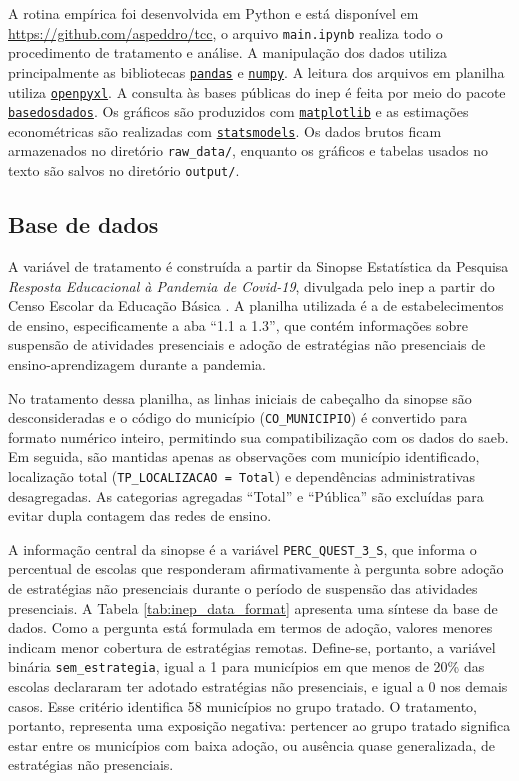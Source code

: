 \documentclass[
	12pt,				%
	openright,			%
	oneside,			%
	a4paper,			%
	brazil,				%
	]{article}
\begin{document}
A rotina empírica foi desenvolvida em Python e está disponível em \url{https://github.com/aspeddro/tcc},
o arquivo \texttt{main.ipynb} realiza todo o procedimento de tratamento e análise.
A manipulação dos dados utiliza principalmente as bibliotecas \texttt{\href{https://pypi.org/project/pandas/}{pandas}}
e \texttt{\href{https://pypi.org/project/numpy}{numpy}}. A leitura dos arquivos em 
planilha utiliza \texttt{\href{https://pypi.org/project/openpyxl/}{openpyxl}}. A consulta 
às bases públicas do \acrshort{inep} é feita por meio do pacote \texttt{\href{https://pypi.org/project/basedosdados/}{basedosdados}}. 
Os gráficos são produzidos com \texttt{\href{https://pypi.org/project/matplotlib}{matplotlib}} e as
estimações econométricas são realizadas com \texttt{\href{https://pypi.org/project/statsmodels}{statsmodels}}.
Os dados brutos ficam armazenados no diretório \texttt{raw\_data/}, enquanto os gráficos
e tabelas usados no texto são salvos no diretório \texttt{output/}.

\subsection{Base de dados}

A variável de tratamento é construída a partir da Sinopse Estatística da
Pesquisa \textit{Resposta Educacional à Pandemia de Covid-19}, divulgada pelo
\acrshort{inep} a partir do Censo Escolar da Educação Básica
\cite{INEP2021_Covid19CensoEscolar2020}. A planilha utilizada é a de
estabelecimentos de ensino, especificamente a aba ``1.1 a 1.3'', que contém
informações sobre suspensão de atividades presenciais e adoção de estratégias
não presenciais de ensino-aprendizagem durante a pandemia.

No tratamento dessa planilha, as linhas iniciais de cabeçalho da sinopse são
desconsideradas e o código do município (\texttt{CO\_MUNICIPIO}) é convertido
para formato numérico inteiro, permitindo sua compatibilização com os dados do
\acrshort{saeb}. Em seguida, são mantidas apenas as observações com município
identificado, localização total (\texttt{TP\_LOCALIZACAO = Total}) e
dependências administrativas desagregadas. As categorias agregadas ``Total'' e
``Pública'' são excluídas para evitar dupla contagem das redes de ensino.

A informação central da sinopse é a variável \texttt{PERC\_QUEST\_3\_S}, que
informa o percentual de escolas que responderam afirmativamente à pergunta sobre
adoção de estratégias não presenciais durante o período de suspensão das
atividades presenciais. A Tabela \ref{tab:inep_data_format} apresenta uma síntese
da base de dados. Como a pergunta está formulada em termos de adoção,
valores menores indicam menor cobertura de estratégias remotas. Define-se,
portanto, a variável binária \texttt{sem\_estrategia}, igual a 1 para municípios
em que menos de 20\% das escolas declararam ter adotado estratégias não
presenciais, e igual a 0 nos demais casos. Esse critério identifica 58
municípios no grupo tratado. O tratamento, portanto, representa uma exposição
negativa: pertencer ao grupo tratado significa estar entre os municípios com
baixa adoção, ou ausência quase generalizada, de estratégias não presenciais.
\end{document}

